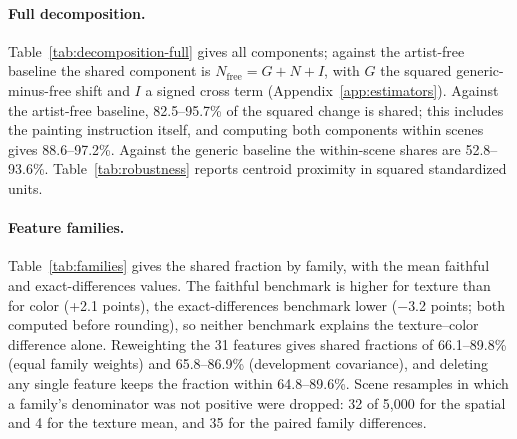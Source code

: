 \paragraph{Full decomposition.} Table~\ref{tab:decomposition-full} gives all components; against the
artist-free baseline the shared component is $N_{\mathrm{free}}=G+N+I$, with $G$ the squared
generic-minus-free shift and $I$ a signed cross term (Appendix~\ref{app:estimators}). Against
the artist-free baseline, 82.5--95.7\% of the squared change is shared; this includes the
painting instruction itself, and computing both components within scenes gives 88.6--97.2\%.
Against the generic baseline the within-scene shares are 52.8--93.6\%. Table~\ref{tab:robustness}
reports centroid proximity in squared standardized units.

\paragraph{Feature families.} Table~\ref{tab:families} gives the shared fraction by family, with the
mean faithful and exact-differences values. The faithful benchmark is higher for texture than for
color (+2.1 points), the exact-differences benchmark lower ($-$3.2 points; both computed before
rounding), so neither benchmark explains the texture--color difference alone. Reweighting the 31
features gives shared fractions of 66.1--89.8\% (equal family weights) and 65.8--86.9\%
(development covariance), and deleting any single feature keeps the fraction within 64.8--89.6\%. Scene resamples in
which a family's denominator was not positive were dropped: 32 of 5,000 for the spatial and 4 for
the texture mean, and 35 for the paired family differences.

